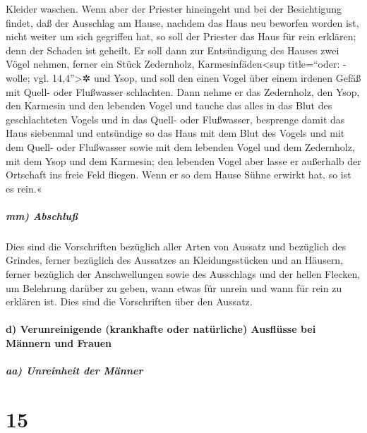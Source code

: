 Kleider waschen. Wenn aber der Priester hineingeht und
bei der Besichtigung findet, daß der Ausschlag am Hause, nachdem das
Haus neu beworfen worden ist, nicht weiter um sich gegriffen hat, so
soll der Priester das Haus für rein erklären; denn der Schaden ist
geheilt. Er soll dann zur Entsündigung des Hauses zwei
Vögel nehmen, ferner ein Stück Zedernholz, Karmesinfäden\textless sup
title=``oder: -wolle; vgl. 14,4''\textgreater✲ und Ysop,
und soll den einen Vogel über einem irdenen Gefäß mit
Quell- oder Flußwasser schlachten. Dann nehme er das
Zedernholz, den Ysop, den Karmesin und den lebenden Vogel und tauche das
alles in das Blut des geschlachteten Vogels und in das Quell- oder
Flußwasser, besprenge damit das Haus siebenmal und
entsündige so das Haus mit dem Blut des Vogels und mit dem Quell- oder
Flußwasser sowie mit dem lebenden Vogel und dem Zedernholz, mit dem Ysop
und dem Karmesin; den lebenden Vogel aber lasse er
außerhalb der Ortschaft ins freie Feld fliegen. Wenn er so dem Hause
Sühne erwirkt hat, so ist es rein.«

\hypertarget{mm-abschluuxdf}{%
\subparagraph{mm) Abschluß}\label{mm-abschluuxdf}}

Dies sind die Vorschriften bezüglich aller Arten von
Aussatz und bezüglich des Grindes, ferner bezüglich des
Aussatzes an Kleidungsstücken und an Häusern, ferner
bezüglich der Anschwellungen sowie des Ausschlags und der hellen
Flecken, um Belehrung darüber zu geben, wann etwas für
unrein und wann für rein zu erklären ist. Dies sind die Vorschriften
über den Aussatz.

\hypertarget{d-verunreinigende-krankhafte-oder-natuxfcrliche-ausfluxfcsse-bei-muxe4nnern-und-frauen}{%
\paragraph{d) Verunreinigende (krankhafte oder natürliche) Ausflüsse bei
Männern und
Frauen}\label{d-verunreinigende-krankhafte-oder-natuxfcrliche-ausfluxfcsse-bei-muxe4nnern-und-frauen}}

\hypertarget{aa-unreinheit-der-muxe4nner}{%
\subparagraph{aa) Unreinheit der
Männer}\label{aa-unreinheit-der-muxe4nner}}

\hypertarget{section-14}{%
\section{15}\label{section-14}}

